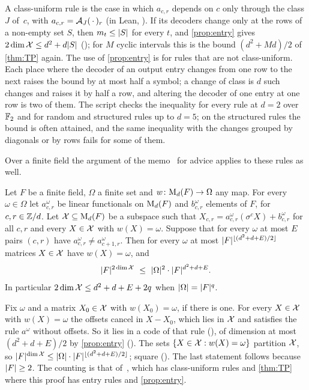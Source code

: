 A class-uniform rule is the case in which $a_{c,r}$ depends on $c$ only through the class $J$ of~$c$, with
$a_{c,r}=\mathcal{A}_J(\,\cdot\,)_r$ (in Lean, ).
If its decoders change only at the rows of a non-empty set $S$, then $m_t\le\lvert S \rvert$ for every $t$, and
\cref{prop:entry} gives $2\dim\mathcal{X}\le d^2+d\lvert S \rvert$ (); for $M$ cyclic
intervals this is the bound $(d^2+Md)/2$ of \cref{thm:TP} again. The use of \cref{prop:entry} is for rules that are not
class-uniform. Each place where the decoder of an output entry changes from one row to the next raises the bound by at
most half a symbol; a change of class is $d$ such changes and raises it by half a row, and altering the decoder of one
entry at one row is two of them. The script  checks the inequality for every rule
at $d=2$ over $\mathbb{F}_2$ and for random and structured rules up to $d=5$; on the structured rules the bound is often
attained, and the same inequality with the changes grouped by diagonals or by rows fails for some of them.

Over a finite field the argument of the memo~\cite{ClassUniformMemo2026} for advice applies to these rules as well.

\begin{corollary}\label{cor:entry-advice}
Let $F$ be a finite field, $\Omega$ a finite set and $w\colon\mathrm{M}_d(F)\to\Omega$ any map. For every $\omega\in\Omega$
let $a^\omega_{c,r}$ be linear functionals on $\mathrm{M}_d(F)$ and $b^\omega_{c,r}$ elements of $F$, for $c,r\in\mathbb{Z}/d$. Let
$\mathcal{X}\subseteq\mathrm{M}_d(F)$ be a subspace such that $X_{c,r}=a^\omega_{c,r}(\sigma^cX)+b^\omega_{c,r}$ for all $c,r$ and
every $X\in\mathcal{X}$ with $w(X)=\omega$. Suppose that for every $\omega$ at most $E$ pairs $(c,r)$ have
$a^\omega_{c,r}\ne a^\omega_{c+1,r}$. Then for every $\omega$ at most $\lvert F \rvert^{\lfloor(d^2+d+E)/2\rfloor}$ matrices
$X\in\mathcal{X}$ have $w(X)=\omega$, and
\[
  \abs F^{2\dim\X}\ \le\ \abs\Omega^2\cdot\abs F^{d^2+d+E} .
\]
In particular $2\dim\mathcal{X}\le d^2+d+E+2q$ when $\lvert \Omega \rvert=\lvert F \rvert^q$.
\end{corollary}

\begin{outline}
Fix $\omega$ and a matrix $X_0\in\mathcal{X}$ with $w(X_0)=\omega$, if there is one. For every $X\in\mathcal{X}$ with $w(X)=\omega$ the
offsets cancel in $X-X_0$, which lies in $\mathcal{X}$ and satisfies the rule $a^\omega$ without offsets. So it lies in a code
of that rule (), of dimension at most $(d^2+d+E)/2$ by \cref{prop:entry}
(). The sets $\{X\in\mathcal{X}:w(X)=\omega\}$ partition $\mathcal{X}$, so
$\lvert F \rvert^{\dim\mathcal{X}}\le\lvert \Omega \rvert\cdot\lvert F \rvert^{\lfloor(d^2+d+E)/2\rfloor}$; square
(). The last statement follows because
$\lvert F \rvert\ge2$. The counting is that
of~\cite[Theorem~5.5]{ClassUniformMemo2026}, which has class-uniform rules and \cref{thm:TP} where this proof has entry
rules and \cref{prop:entry}.
\end{outline}

